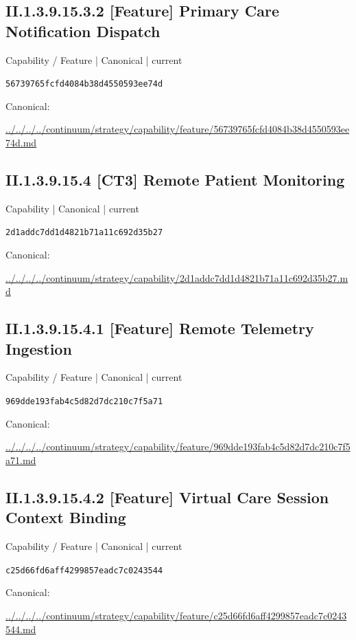 \documentclass[10pt,a4paper]{article}
\begin{document}
\subsection*{II.1.3.9.15.3.2 [Feature] Primary Care Notification Dispatch}
\label{element-56739765fcfd4084b38d4550593ee74d}
{\small Capability / Feature | Canonical | current}\par
\texttt{56739765fcfd4084b38d4550593ee74d}\par
Canonical: \par
{\footnotesize\url{../../../../continuum/strategy/capability/feature/56739765fcfd4084b38d4550593ee74d.md}}\par
\subsection*{II.1.3.9.15.4 [CT3] Remote Patient Monitoring}
\label{element-2d1addc7dd1d4821b71a11c692d35b27}
{\small Capability | Canonical | current}\par
\texttt{2d1addc7dd1d4821b71a11c692d35b27}\par
Canonical: \par
{\footnotesize\url{../../../../continuum/strategy/capability/2d1addc7dd1d4821b71a11c692d35b27.md}}\par
\subsection*{II.1.3.9.15.4.1 [Feature] Remote Telemetry Ingestion}
\label{element-969dde193fab4c5d82d7dc210c7f5a71}
{\small Capability / Feature | Canonical | current}\par
\texttt{969dde193fab4c5d82d7dc210c7f5a71}\par
Canonical: \par
{\footnotesize\url{../../../../continuum/strategy/capability/feature/969dde193fab4c5d82d7dc210c7f5a71.md}}\par
\subsection*{II.1.3.9.15.4.2 [Feature] Virtual Care Session Context Binding}
\label{element-c25d66fd6aff4299857eadc7c0243544}
{\small Capability / Feature | Canonical | current}\par
\texttt{c25d66fd6aff4299857eadc7c0243544}\par
Canonical: \par
{\footnotesize\url{../../../../continuum/strategy/capability/feature/c25d66fd6aff4299857eadc7c0243544.md}}\par
\end{document}
